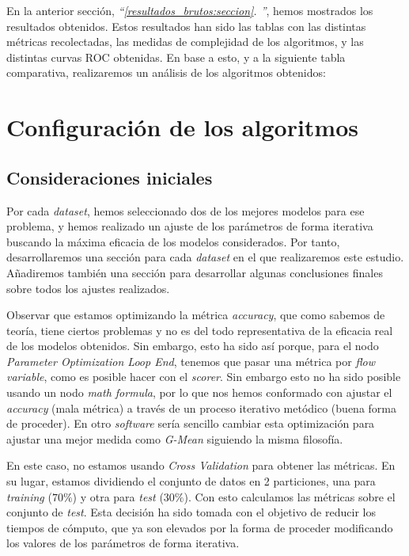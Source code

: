 \documentclass[11pt]{article}
\newcommand{\customcite}[1]{\emph{``\ref{#1}. \nameref{#1}''}}
\begin{document}
En la anterior sección, \customcite{resultados_brutos:seccion}, hemos mostrados los resultados obtenidos. Estos resultados han sido las tablas con las distintas métricas recolectadas, las medidas de complejidad de los algoritmos, y las distintas curvas ROC obtenidas. En base a esto, y a la siguiente tabla comparativa, realizaremos un análisis de los algoritmos obtenidos:


\pagebreak

\section{Configuración de los algoritmos}

\subsection{Consideraciones iniciales}

Por cada \emph{dataset}, hemos seleccionado dos de los mejores modelos para ese problema, y hemos realizado un ajuste de los parámetros de forma iterativa buscando la máxima eficacia de los modelos considerados. Por tanto, desarrollaremos una sección para cada \emph{dataset} en el que realizaremos este estudio. Añadiremos también una sección para desarrollar algunas conclusiones finales sobre todos los ajustes realizados.

Observar que estamos optimizando la métrica \emph{accuracy}, que como sabemos de teoría, tiene ciertos problemas y no es del todo representativa de la eficacia real de los modelos obtenidos. Sin embargo, esto ha sido así porque, para el nodo \emph{Parameter Optimization Loop End}, tenemos que pasar una métrica por \emph{flow variable}, como es posible hacer con el \emph{scorer}. Sin embargo esto no ha sido posible usando un nodo \emph{math formula}, por lo que nos hemos conformado con ajustar el \emph{accuracy} (mala métrica) a través de un proceso iterativo metódico (buena forma de proceder). En otro \emph{software} sería sencillo cambiar esta optimización para ajustar una mejor medida como \emph{G-Mean} siguiendo la misma filosofía.

En este caso, no estamos usando \emph{Cross Validation} para obtener las métricas. En su lugar, estamos dividiendo el conjunto de datos en 2 particiones, una para \emph{training} ($70\%$) y otra para \emph{test} ($30\%$). Con esto calculamos las métricas sobre el conjunto de \emph{test}. Esta decisión ha sido tomada con el objetivo de reducir los tiempos de cómputo, que ya son elevados por la forma de proceder modificando los valores de los parámetros de forma iterativa.
\end{document}
